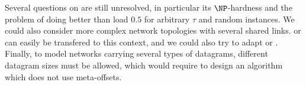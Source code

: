 Several questions on \pma are still unresolved, in particular its $\NP$-hardness
and the problem of doing better than load $0.5$ for arbitrary $\tau$ and random instances.
We could also consider more complex network topologies with several shared links.
\firstfit or \metaoffset can easily be transfered to this context, and we could also try to adapt \compactpair or \swapandmove. Finally, to model networks carrying several types of datagrams, different datagram sizes must be allowed, which would require to design an algorithm which does not use meta-offsets. 

